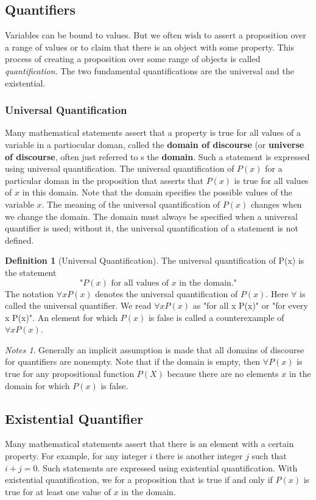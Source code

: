 \documentclass[11pt]{book} %
\theoremstyle {definition}
\newtheorem {definition}{Definition}[section]
\theoremstyle {remark}
\newtheorem*{notes}{Notes}
\begin{document}
   \subsection {Quantifiers}
Variables can be bound to values. But we often wish to assert a proposition over a range of values or to claim that there is an object with some property. This process of creating a proposition over some range of objects is called \textit{quantification}. The two fundamental quantifications are the universal and the existential.

        \subsubsection {Universal Quantification}
Many mathematical statements assert that a property is true for all values of a variable in a partiocular doman, called the \textbf{domain of discourse} (or \textbf{universe of discourse}, often just referred to s the \textbf{domain}. Such a statement is expressed using universal quantification. The universal quantification of $P(x)$ for a particular doman in the proposition that asserts that $P(x)$ is true for all values of $x$ in this domain. Note that the domain specifies the possible values of the variable $x$. The meaning of the universal quantification of $P(x)$ changes when we change the domain. The domain must always be specified when a universal quantifier is used; without it, the universal quantification of a statement is not defined.

\begin{definition}[Universal Quantification]
The universal quantification of P(x) is the statement 
$$\text{"}P(x) \text{ for all values of }x \text{ in the domain."}$$
The notation $\forall x P(x)$ denotes the universal quantification of $P(x)$. Here $\forall$ is called the universal quantifier. We read $\forall x P(x)$ as "for all x P(x)" or "for every x P(x)". An element for which $P(x)$ is false is called a counterexample of $\forall x P(x)$.
\end{definition}

\begin{notes}
Generally an implicit assumption is made that all domains of discourse for quantifiers are nonempty. Note that if the domain is empty, then $\forall P(x)$ is true for any propositional function $P(X)$ because there are no elements $x$ in the domain for which $P(x)$ is false. 
\end{notes}


        \subsection {Existential Quantifier}
Many mathematical statements assert that there is an element with a certain property. For example, for any integer $i$ there is another integer $j$ such that $i+j=0$. Such statements are expressed using existential quantification. With existential quantification, we for a proposition that is true if and only if $P(x)$ is true for at least one value of $x$ in the domain.
\end{document}
